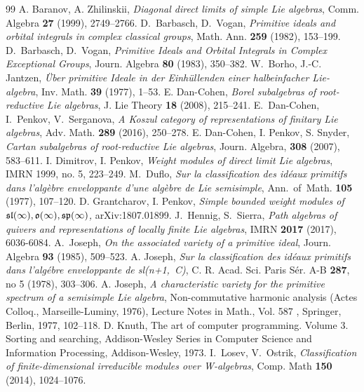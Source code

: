 \documentclass[10pt]{amsart}\oddsidemargin -1mm \evensidemargin -1mm \topmargin -15mm\headheight5mm \headsep 3.5mm \textheight 245mm\textwidth 170mm
\theoremstyle{definition}\newtheorem{theorem}{Theorem}[section]\newtheorem{lemma}[theorem]{Lemma}\newtheorem{remark}[theorem]{Remark}\newtheorem{proposition}[theorem]{Proposition}\newtheorem{corollary}[theorem]{Corollary}\newtheorem{definition}[theorem]{Definition}\newtheorem{Ex}[theorem]{Example}\newtheorem{obs}[theorem]{Observation}\newtheorem{nota}[theorem]{Notation}
\begin{document}
\begin{thebibliography}{99}
 A. Baranov, A. Zhilinskii, {\it Diagonal direct limits of simple Lie algebras},  Comm. Algebra {\bf 27} (1999), 2749--2766.
 D.~Barbasch, D.~Vogan, {\it Primitive ideals and orbital integrals in complex classical groups}, Math. Ann. {\bf 259} (1982), 153--199.
 D.~Barbasch, D.~Vogan, {\it Primitive Ideals and Orbital Integrals in Complex Exceptional Groups}, Journ. Algebra {\bf 80} (1983), 350--382.
 W.~Borho, J.-C. Jantzen,  {\it \"Uber primitive Ideale in der Einh\"ullenden einer halbeinfacher Lie-algebra}, Inv. Math. {\bf 39} (1977), 1--53.
 E. Dan-Cohen, {\it Borel subalgebras of root-reductive Lie algebras}, J. Lie Theory {\bf 18} (2008), 215--241.
 E.~Dan-Cohen, I.~Penkov, V.~Serganova, {\it A Koszul category of representations of finitary Lie algebras}, Adv. Math. {\bf 289} (2016), 250--278.
 E. Dan-Cohen, I. Penkov, S. Snyder, {\it Cartan subalgebras of root-reductive Lie algebras}, Journ. Algebra, {\bf 308} (2007), 583--611. 
 I. Dimitrov, I. Penkov, {\it Weight modules of direct limit Lie algebras}, IMRN 1999, no. 5, 223--249.
 M.~Duflo, {\it Sur la classiﬁcation des id\'eaux primitifs dans l'alg\`ebre enveloppante d'une alg\`ebre de Lie semisimple}, Ann.~of~Math. {\bf 105} (1977), 107--120.
 D. Grantcharov, I. Penkov, {\it Simple bounded weight modules of $\frak{sl}(\infty), \frak o(\infty), \frak{sp}(\infty)$,} arXiv:1807.01899.
 J.~Hennig, S.~Sierra, {\it Path algebras of quivers and representations of locally finite Lie algebras}, IMRN {\bf 2017} (2017), 6036-6084.
 A.~Joseph, {\it On the associated variety of a primitive ideal}, Journ. Algebra {\bf 93} (1985), 509--523.
 A. Joseph, {\it Sur la classification des id\'eaux primitifs dans l'alg\'ebre enveloppante de sl(n+1,~C)}, C. R. Acad. Sci. Paris S\'er. A-B {\bf 287}, no 5 (1978), 303--306.
 A. Joseph, {\it A characteristic variety for the primitive spectrum of a semisimple Lie algebra}, Non-commutative harmonic analysis (Actes Colloq., Marseille-Luminy, 1976), Lecture Notes in Math., Vol. {587 }, Springer, Berlin, 1977, 102--118.
 D. Knuth, The art of computer programming. Volume 3. Sorting and searching, Addison-Wesley Series in Computer Science and Information Processing,  Addison-Wesley, 1973.
 I.~Losev,  V.~Ostrik, {\it Classiﬁcation of finite-dimensional irreducible modules over W-algebras}, Comp. Math {\bf 150} (2014), 1024--1076.

\end{thebibliography}
\end{document}

